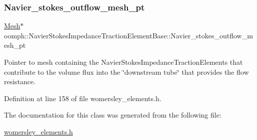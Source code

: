 \subsubsection{\texorpdfstring{Navier\+\_\+stokes\+\_\+outflow\+\_\+mesh\+\_\+pt}{Navier\_stokes\_outflow\_mesh\_pt}}
{\footnotesize\ttfamily \hyperlink{classoomph_1_1Mesh}{Mesh}$\ast$ oomph\+::\+Navier\+Stokes\+Impedance\+Traction\+Element\+Base\+::\+Navier\+\_\+stokes\+\_\+outflow\+\_\+mesh\+\_\+pt\hspace{0.3cm}{\ttfamily [protected]}}



Pointer to mesh containing the Navier\+Stokes\+Impedance\+Traction\+Elements that contribute to the volume flux into the \char`\"{}downstream tube\char`\"{} that provides the flow resistance. 



Definition at line 158 of file womersley\+\_\+elements.\+h.



The documentation for this class was generated from the following file\+:\begin{DoxyCompactItemize}
\item 
\hyperlink{womersley__elements_8h}{womersley\+\_\+elements.\+h}\end{DoxyCompactItemize}
